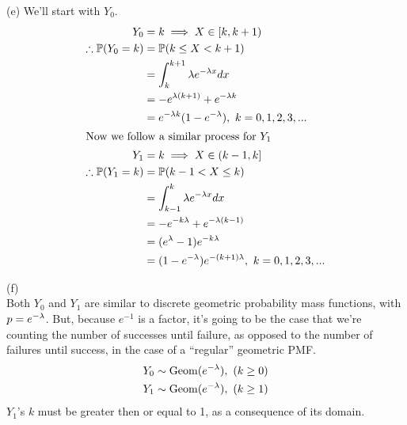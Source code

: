\documentclass[a4paper,12pt]{report}
\begin{document}
\sol (e)
We'll start with $Y_0$.
\begin{align*}
  Y_0 &= k \implies X \in [k, k+1) \\
  \therefore \mathbb{P}(Y_0 = k) &= \mathbb{P}(k \leq X < k+1) \\
  &= \int_k^{k+1} \lambda e^{-\lambda x}dx \\
  &= -e^{\lambda (k + 1)} + e^{-\lambda k} \\
  &= e^{-\lambda k} (1 - e^{-\lambda}),\ k = 0,1,2,3,... \\
  \intertext{Now we follow a similar process for $Y_1$}
  Y_1 &= k \implies X\in (k-1, k] \\
  \therefore \mathbb{P}(Y_1 = k) &= \mathbb{P}(k-1 < X \leq k) \\ 
  &= \int_{k-1}^{k} \lambda e^{-\lambda x}dx \\
  &= -e^{-k\lambda} + e^{-\lambda(k-1)} \\
  &= (e^\lambda - 1)e^{-k\lambda} \\
  &= (1 - e^{-\lambda})e^{-(k+1)\lambda},\ k = 0,1,2,3,...
\end{align*}

\newpage
\sol (f) \\
Both $Y_0$ and $Y_1$ are similar to discrete geometric probability mass functions, with $p = e^{-\lambda}$. But, because $e^{-1}$ is a factor, it's going to be the case that we're counting the number of successes until failure, as opposed to the number of failures until success, in the case of a ``regular'' geometric PMF.
\begin{gather*}
  Y_0 \sim \operatorname{Geom}(e^{-\lambda}),\ (k \geq 0) \\
  Y_1 \sim \operatorname{Geom}(e^{-\lambda}),\ (k \geq 1)
\end{gather*}
$Y_1$'s $k$ must be greater then or equal to 1, as a consequence of its domain.
\end{document}
